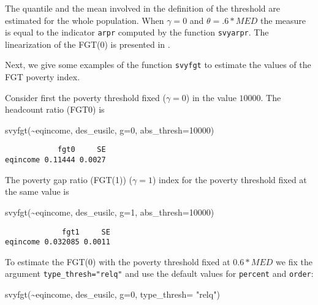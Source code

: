 \documentclass[
]{book}
\newenvironment{Shaded}{\begin{snugshade}}{\end{snugshade}}
\newcommand{\AttributeTok}[1]{\textcolor[rgb]{0.77,0.63,0.00}{#1}}
\newcommand{\DecValTok}[1]{\textcolor[rgb]{0.00,0.00,0.81}{#1}}
\newcommand{\FunctionTok}[1]{\textcolor[rgb]{0.00,0.00,0.00}{#1}}
\newcommand{\NormalTok}[1]{#1}
\newcommand{\SpecialCharTok}[1]{\textcolor[rgb]{0.00,0.00,0.00}{#1}}
\newcommand{\StringTok}[1]{\textcolor[rgb]{0.31,0.60,0.02}{#1}}
\begin{document}
The quantile and the mean involved in the definition of the threshold are estimated for the whole population. When \(\gamma=0\) and \(\theta= .6*MED\) the measure is equal to the indicator \texttt{arpr} computed by the function \texttt{svyarpr}. The linearization of the FGT(0) is presented in \textcite{berger2003}.

Next, we give some examples of the function \texttt{svyfgt} to estimate the values of the FGT poverty index.

Consider first the poverty threshold fixed (\(\gamma=0\)) in the value \(10000\). The headcount ratio (FGT0) is

\begin{Shaded}
\begin{Highlighting}[]
\FunctionTok{svyfgt}\NormalTok{(}\SpecialCharTok{\textasciitilde{}}\NormalTok{eqincome, des\_eusilc, }\AttributeTok{g=}\DecValTok{0}\NormalTok{, }\AttributeTok{abs\_thresh=}\DecValTok{10000}\NormalTok{)}
\end{Highlighting}
\end{Shaded}

\begin{verbatim}
            fgt0     SE
eqincome 0.11444 0.0027
\end{verbatim}

The poverty gap ratio (FGT(1)) (\(\gamma=1\)) index for the poverty threshold fixed at the same value is

\begin{Shaded}
\begin{Highlighting}[]
\FunctionTok{svyfgt}\NormalTok{(}\SpecialCharTok{\textasciitilde{}}\NormalTok{eqincome, des\_eusilc, }\AttributeTok{g=}\DecValTok{1}\NormalTok{, }\AttributeTok{abs\_thresh=}\DecValTok{10000}\NormalTok{)}
\end{Highlighting}
\end{Shaded}

\begin{verbatim}
             fgt1     SE
eqincome 0.032085 0.0011
\end{verbatim}

To estimate the FGT(0) with the poverty threshold fixed at \(0.6* MED\) we fix the argument \texttt{type\_thresh="relq"} and use the default values for \texttt{percent} and \texttt{order}:

\begin{Shaded}
\begin{Highlighting}[]
\FunctionTok{svyfgt}\NormalTok{(}\SpecialCharTok{\textasciitilde{}}\NormalTok{eqincome, des\_eusilc, }\AttributeTok{g=}\DecValTok{0}\NormalTok{, }\AttributeTok{type\_thresh=} \StringTok{"relq"}\NormalTok{)}
\end{Highlighting}
\end{Shaded}
\end{document}
